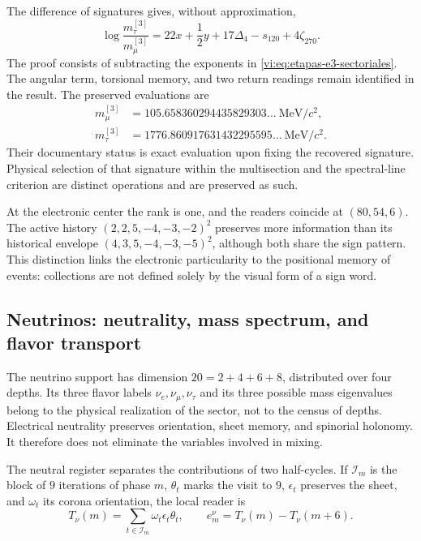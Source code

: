 The difference of signatures gives, without approximation,
\begin{equation}
 \log\frac{m_\tau^{[3]}}{m_\mu^{[3]}}
 =22x+\frac12y+17\Delta_4-s_{120}+4\zeta_{270}.
 \label{vi:eq:razon-tau-muon}
\end{equation}
The proof consists of subtracting the exponents in
\eqref{vi:eq:etapas-e3-sectoriales}. The angular term, torsional
memory, and two return readings remain identified in the
result. The preserved evaluations are
\begin{align*}
 m_\mu^{[3]}&=105.658360294435829303\ldots\ \mathrm{MeV}/c^2,\\
 m_\tau^{[3]}&=1776.860917631432295595\ldots\ \mathrm{MeV}/c^2.
\end{align*}
Their documentary status is exact evaluation upon fixing the recovered signature.
Physical selection of that signature within the multisection and the spectral-line
criterion are distinct operations and are preserved as such.

At the electronic center the rank is one, and the readers coincide at
\((80,54,6)\). The active history
\((2,2,5,-4,-3,-2)^2\) preserves more information than its historical
envelope \((4,3,5,-4,-3,-5)^2\), although both share the sign
pattern. This distinction links the electronic particularity to the
positional memory of events: collections are not defined solely by
the visual form of a sign word.

\subsection{Neutrinos: neutrality, mass spectrum, and flavor transport}
\label{vi:subsec:neutrinos-familias}

The neutrino support has dimension \(20=2+4+6+8\), distributed over
four depths. Its three flavor labels
\(\nu_e,\nu_\mu,\nu_\tau\) and its three possible mass eigenvalues
belong to the physical realization of the sector, not to the census of
depths. Electrical neutrality preserves orientation,
sheet memory, and spinorial holonomy. It therefore does not eliminate the
variables involved in mixing.

The neutral register separates the contributions of two half-cycles. If
\(\mathcal I_m\) is the block of \(9\) iterations of phase \(m\),
\(\theta_t\) marks the visit to \(9\), \(\epsilon_t\) preserves the sheet,
and \(\omega_t\) its corona orientation, the local reader is
\[
 T_\nu(m)=\sum_{t\in\mathcal I_m}\omega_t\epsilon_t\theta_t,
 \qquad e_m^\nu=T_\nu(m)-T_\nu(m+6).
\]


